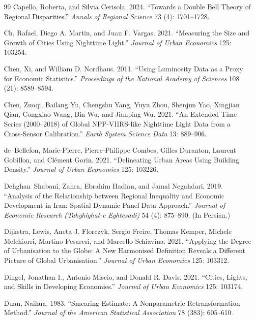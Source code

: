 \documentclass[11pt,a4paper]{article}
\begin{document}
\begin{thebibliography}{99}
Capello, Roberta, and Silvia Cerisola. 2024. ``Towards a Double Bell Theory of Regional Disparities.'' \textit{Annals of Regional Science} 73 (4): 1701--1728.

Ch, Rafael, Diego A. Martin, and Juan F. Vargas. 2021. ``Measuring the Size and Growth of Cities Using Nighttime Light.'' \textit{Journal of Urban Economics} 125: 103254.

Chen, Xi, and William D. Nordhaus. 2011. ``Using Luminosity Data as a Proxy for Economic Statistics.'' \textit{Proceedings of the National Academy of Sciences} 108 (21): 8589--8594.

Chen, Zuoqi, Bailang Yu, Chengshu Yang, Yuyu Zhou, Shenjun Yao, Xingjian Qian, Congxiao Wang, Bin Wu, and Jianping Wu. 2021. ``An Extended Time Series (2000--2018) of Global NPP-VIIRS-like Nighttime Light Data from a Cross-Sensor Calibration.'' \textit{Earth System Science Data} 13: 889--906.

de~Bellefon, Marie-Pierre, Pierre-Philippe Combes, Gilles Duranton, Laurent Gobillon, and Cl\'ement Gorin. 2021. ``Delineating Urban Areas Using Building Density.'' \textit{Journal of Urban Economics} 125: 103226.

Dehghan~Shabani, Zahra, Ebrahim Hadian, and Jamal Negahdari. 2019. ``Analysis of the Relationship between Regional Inequality and Economic Development in Iran: Spatial Dynamic Panel Data Approach.'' \textit{Journal of Economic Research (Tahghighat-e Eghtesadi)} 54 (4): 875--890. (In Persian.)

Dijkstra, Lewis, Aneta J. Florczyk, Sergio Freire, Thomas Kemper, Michele Melchiorri, Martino Pesaresi, and Marcello Schiavina. 2021. ``Applying the Degree of Urbanisation to the Globe: A New Harmonised Definition Reveals a Different Picture of Global Urbanisation.'' \textit{Journal of Urban Economics} 125: 103312.

Dingel, Jonathan I., Antonio Miscio, and Donald R. Davis. 2021. ``Cities, Lights, and Skills in Developing Economies.'' \textit{Journal of Urban Economics} 125: 103174.

Duan, Naihua. 1983. ``Smearing Estimate: A Nonparametric Retransformation Method.'' \textit{Journal of the American Statistical Association} 78 (383): 605--610.


\end{thebibliography}
\end{document}
